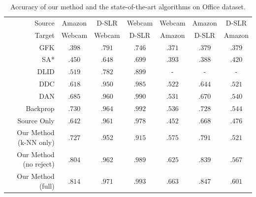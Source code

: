 \begin{table}[ht]
\setlength{\tabcolsep}{3pt}
\caption{Accuracy of our method and the state-of-the-art algorithms on Office dataset.}
\vspace{-3mm}
\label{tab:res}
\begin{sc}
\begin{center}
\begin{small}
\begin{tabular}{@{}rcccccc@{}} \toprule 
 Source & Amazon & D-SLR & Webcam & Webcam &Amazon & D-SLR \\
 Target & Webcam & Webcam & D-SLR & Amazon & D-SLR & Amazon \\
 \midrule
GFK \cite{gong2012} & $.398$ & $.791$ & $.746 $ & $.371$ & $.379$ & .379   \\
SA* \cite{fernando13} & $.450$ & $.648$ & $.699$ & $.393$ & $.388$ & $.420$ \\
DLID \cite{chopra13} & $.519$ & $.782$ & $.899$ & -&- &- \\
DDC \cite{tzeng14} & $.618$ & $.950$ & $.985$ & $.522$ & $.644$& $.521$\\
DAN \cite{wang15} & $.685$ & $.960$ & $.990$ & $.531$ & $.670$ & $.540$ \\
Backprop \cite{ganin15} & $.730$ &$.964$ & $.992$ & $.536$ & $.728$ & $.544$\\
\midrule
Source Only & $.642$ & $.961$ & $.978$ & $.452$ & $.668$ & $.476$ \\
Our Method (k-NN only) & $.727$ &.952 & $.915$ & $.575$ & $.791$ & $.521$ \\
Our Method (no reject) & $.804$ &$.962$ & $.989$ & $.625$ & $.839$ & $.567$ \\
Our Method (full) & $\mathbf{.814}$ & $\mathbf{.971}$ & $\mathbf{.993}$ & $\mathbf{.663}$ & $\mathbf{.847}$ & $\mathbf{.601}$ \\
\bottomrule
\end{tabular}%
\end{small}
\end{center}
\end{sc}
\vspace{-0mm}
\end{table}

